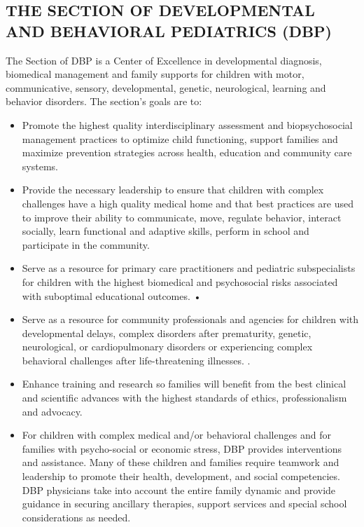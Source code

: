 \subsection*{THE SECTION OF DEVELOPMENTAL AND BEHAVIORAL PEDIATRICS (DBP)}
The Section of DBP is a Center of Excellence in developmental diagnosis, biomedical management and family supports for children with motor, communicative, sensory, developmental, genetic, neurological, learning and behavior disorders. The section’s goals are to:
\begin{itemize}

\item Promote the highest quality interdisciplinary assessment and biopsychosocial management practices to optimize child functioning, support families and maximize prevention strategies across health, education and community care systems.
\item  Provide the necessary leadership to ensure that children with complex challenges have a high quality medical home and that best practices are used to improve their ability to communicate, move, regulate behavior, interact socially, learn functional and adaptive skills, perform in school and participate in the community.  
\item Serve as a resource for primary care practitioners and pediatric subspecialists for children with the highest biomedical and psychosocial risks associated with suboptimal educational outcomes. • \item Serve as a resource for community professionals and agencies for children with developmental delays, complex disorders after prematurity, genetic, neurological, or cardiopulmonary disorders or experiencing complex behavioral challenges after life-threatening illnesses. . 
\item Enhance training and research so families will benefit from the best clinical and scientific advances with the highest standards of ethics, professionalism and advocacy. 
\item For children with complex medical and/or behavioral challenges and for families with psycho-social or economic stress, DBP provides interventions and assistance. Many of these children and families require teamwork and leadership to promote their health, development, and social competencies. DBP physicians take into account the entire family dynamic and provide guidance in securing ancillary therapies, support services and special school considerations as needed.  

\end{itemize}
